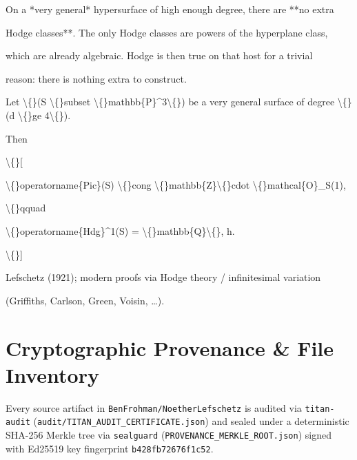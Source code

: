 \documentclass[11pt,a4paper]{article}
\begin{document}
On a *very general* hypersurface of high enough degree, there are **no extra

Hodge classes**. The only Hodge classes are powers of the hyperplane class,

which are already algebraic. Hodge is then true on that host for a trivial

reason: there is nothing extra to construct.

Let \textbackslash\{\}(S \textbackslash\{\}subset \textbackslash\{\}mathbb\{P\}\textasciicircum{}3\textbackslash\{\}) be a very general surface of degree \textbackslash\{\}(d \textbackslash\{\}ge 4\textbackslash\{\}).

Then

\textbackslash\{\}[

\textbackslash\{\}operatorname\{Pic\}(S) \textbackslash\{\}cong \textbackslash\{\}mathbb\{Z\}\textbackslash\{\}cdot \textbackslash\{\}mathcal\{O\}\_S(1),

\textbackslash\{\}qquad

\textbackslash\{\}operatorname\{Hdg\}\textasciicircum{}1(S) = \textbackslash\{\}mathbb\{Q\}\textbackslash\{\}, h.

\textbackslash\{\}]

Lefschetz (1921); modern proofs via Hodge theory / infinitesimal variation

(Griffiths, Carlson, Green, Voisin, …).

\section{Cryptographic Provenance \& File Inventory}
Every source artifact in \texttt{BenFrohman/NoetherLefschetz} is audited via \texttt{titan-audit}
(\texttt{audit/TITAN\_AUDIT\_CERTIFICATE.json}) and sealed under a deterministic SHA-256 Merkle tree via
\texttt{sealguard} (\texttt{PROVENANCE\_MERKLE\_ROOT.json}) signed with Ed25519 key fingerprint
\texttt{b428fb72676f1c52}.
\end{document}
